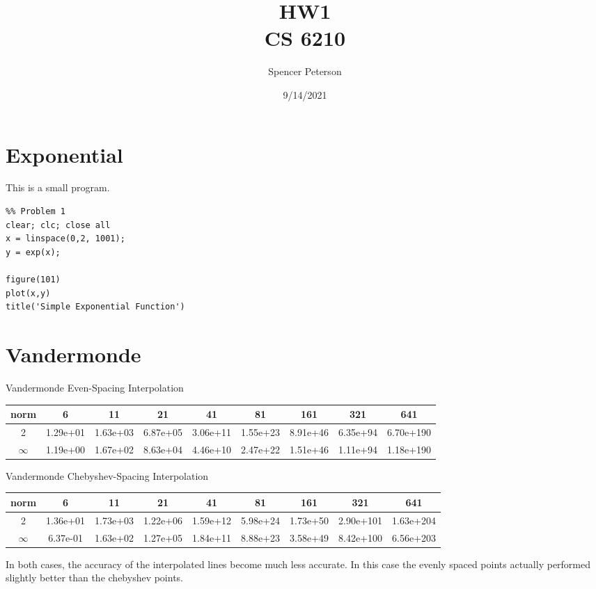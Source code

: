 \documentclass{article}
\title{HW1 \\
	\large CS 6210}
\date{9/14/2021}
\author{Spencer Peterson}
\begin{document}
\maketitle

\section{Exponential}

This is a small program. 
\begin{verbatim}
%% Problem 1
clear; clc; close all
x = linspace(0,2, 1001);
y = exp(x);

figure(101)
plot(x,y)
title('Simple Exponential Function')

\end{verbatim}


\section{Vandermonde}

Vandermonde Even-Spacing Interpolation
\begin{center}
\begin{tabular}{| c | c | c | c | c | c | c | c | c |}
\hline norm & 6 & 11 & 21 & 41 & 81 & 161 & 321 & 641 \\ \hline \hline 
2 & 1.29e+01 & 1.63e+03 &  6.87e+05 & 3.06e+11 &  1.55e+23 & 8.91e+46 &  6.35e+94 & 6.70e+190 \\ \hline 
$\infty$ & 1.19e+00 & 1.67e+02 &  8.63e+04 & 4.46e+10 &  2.47e+22 & 1.51e+46 &  1.11e+94 & 1.18e+190 \\ \hline 
\end{tabular}
\end{center}

Vandermonde Chebyshev-Spacing Interpolation
\begin{center}
\begin{tabular}{| c | c | c | c | c | c | c | c | c |}
\hline norm & 6 & 11 & 21 & 41 & 81 & 161 & 321 & 641 \\ \hline \hline 
2 & 1.36e+01 & 1.73e+03 &  1.22e+06 & 1.59e+12 &  5.98e+24 & 1.73e+50 &  2.90e+101 & 1.63e+204 \\ \hline 
$\infty$ & 6.37e-01 & 1.63e+02 &  1.27e+05 & 1.84e+11 &  8.88e+23 & 3.58e+49 &  8.42e+100 & 6.56e+203 \\ \hline 
\end{tabular}
\end{center}

In both cases, the accuracy of the interpolated lines become much less accurate. In this case the evenly spaced points actually performed slightly better than the chebyshev points. 
\end{document}
